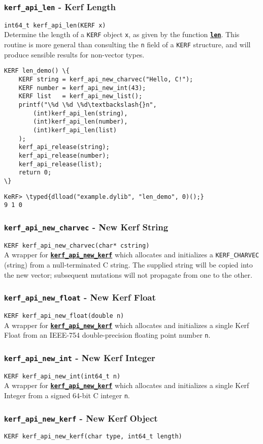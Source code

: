 \documentclass{article}
\newcommand{\typed}[1]{\textcolor{TealBlue}{#1}}
\newcommand{\primu}[2]{\hyperref[prim:#2]{\textbf{\texttt{#1}}}}
\newcommand{\prim}[1]{\primu{#1}{#1}}
\newcommand{\ffidef}[3]{\subsubsection{\texttt{#1} - #2}\label{ffi:#3}}
\newcommand{\ffi}[2]{\hyperref[ffi:#2]{\textbf{\texttt{#1}}}}
\begin{document}
\ffidef{kerf\_api\_len}{Kerf Length}{kerfApiLen}
\texttt{int64\_t kerf\_api\_len(KERF x)}\\

Determine the length of a \texttt{KERF} object \texttt{x}, as given by the function \prim{len}. This routine is more general than consulting the \texttt{n} field of a \texttt{KERF} structure, and will produce sensible results for non-vector types.
\begin{Verbatim}
KERF len_demo() \{
	KERF string = kerf_api_new_charvec("Hello, C!");
	KERF number = kerf_api_new_int(43);
	KERF list   = kerf_api_new_list();
	printf("\%d \%d \%d\textbackslash{}n",
		(int)kerf_api_len(string),
		(int)kerf_api_len(number),
		(int)kerf_api_len(list)
	);
	kerf_api_release(string);
	kerf_api_release(number);
	kerf_api_release(list);
	return 0;
\}
\end{Verbatim}
\begin{Verbatim}
KeRF> \typed{dlload("example.dylib", "len_demo", 0)();}
9 1 0
\end{Verbatim}

\pagebreak
\ffidef{kerf\_api\_new\_charvec}{New Kerf String}{kerfApiNewCharvec}
\texttt{KERF kerf\_api\_new\_charvec(char* cstring)}\\

A wrapper for \ffi{kerf\_api\_new\_kerf}{kerfApiNewKerf} which allocates and initializes a \texttt{KERF\_CHARVEC} (string) from a null-terminated C string. The supplied string will be copied into the new vector; subsequent mutations will not propagate from one to the other.

\ffidef{kerf\_api\_new\_float}{New Kerf Float}{kerfApiNewFloat}
\texttt{KERF kerf\_api\_new\_float(double n)}\\

A wrapper for \ffi{kerf\_api\_new\_kerf}{kerfApiNewKerf} which allocates and initializes a single Kerf Float from an IEEE-754 double-precision floating point number \texttt{n}.

\ffidef{kerf\_api\_new\_int}{New Kerf Integer}{kerfApiNewInt}
\texttt{KERF kerf\_api\_new\_int(int64\_t n)}\\

A wrapper for \ffi{kerf\_api\_new\_kerf}{kerfApiNewKerf} which allocates and initializes a single Kerf Integer from a signed 64-bit C integer \texttt{n}.

\ffidef{kerf\_api\_new\_kerf}{New Kerf Object}{kerfApiNewKerf}
\texttt{KERF kerf\_api\_new\_kerf(char type, int64\_t length)}\\
\end{document}
